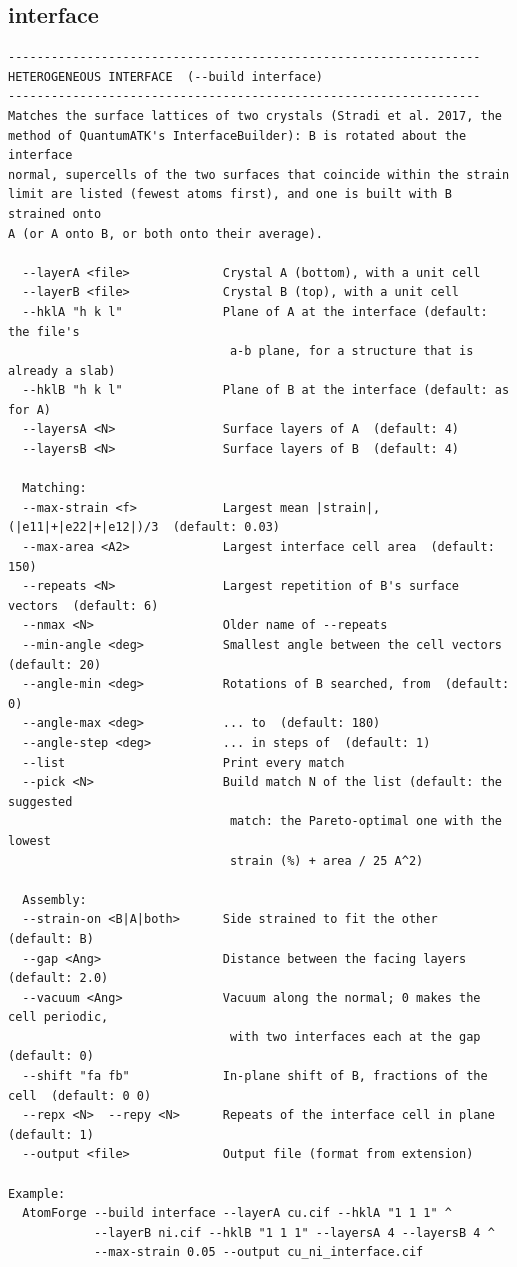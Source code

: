 \clearpage

\subsection{interface}

\begin{lstlisting}
------------------------------------------------------------------
HETEROGENEOUS INTERFACE  (--build interface)
------------------------------------------------------------------
Matches the surface lattices of two crystals (Stradi et al. 2017, the
method of QuantumATK's InterfaceBuilder): B is rotated about the interface
normal, supercells of the two surfaces that coincide within the strain
limit are listed (fewest atoms first), and one is built with B strained onto
A (or A onto B, or both onto their average).

  --layerA <file>             Crystal A (bottom), with a unit cell
  --layerB <file>             Crystal B (top), with a unit cell
  --hklA "h k l"              Plane of A at the interface (default: the file's
                               a-b plane, for a structure that is already a slab)
  --hklB "h k l"              Plane of B at the interface (default: as for A)
  --layersA <N>               Surface layers of A  (default: 4)
  --layersB <N>               Surface layers of B  (default: 4)

  Matching:
  --max-strain <f>            Largest mean |strain|, (|e11|+|e22|+|e12|)/3  (default: 0.03)
  --max-area <A2>             Largest interface cell area  (default: 150)
  --repeats <N>               Largest repetition of B's surface vectors  (default: 6)
  --nmax <N>                  Older name of --repeats
  --min-angle <deg>           Smallest angle between the cell vectors  (default: 20)
  --angle-min <deg>           Rotations of B searched, from  (default: 0)
  --angle-max <deg>           ... to  (default: 180)
  --angle-step <deg>          ... in steps of  (default: 1)
  --list                      Print every match
  --pick <N>                  Build match N of the list (default: the suggested
                               match: the Pareto-optimal one with the lowest
                               strain (%) + area / 25 A^2)

  Assembly:
  --strain-on <B|A|both>      Side strained to fit the other  (default: B)
  --gap <Ang>                 Distance between the facing layers  (default: 2.0)
  --vacuum <Ang>              Vacuum along the normal; 0 makes the cell periodic,
                               with two interfaces each at the gap  (default: 0)
  --shift "fa fb"             In-plane shift of B, fractions of the cell  (default: 0 0)
  --repx <N>  --repy <N>      Repeats of the interface cell in plane  (default: 1)
  --output <file>             Output file (format from extension)

Example:
  AtomForge --build interface --layerA cu.cif --hklA "1 1 1" ^
            --layerB ni.cif --hklB "1 1 1" --layersA 4 --layersB 4 ^
            --max-strain 0.05 --output cu_ni_interface.cif
\end{lstlisting}

